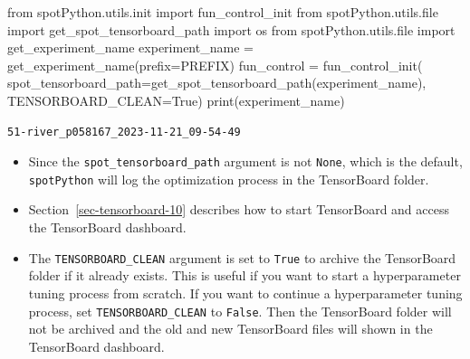\documentclass[
  letterpaper,
  DIV=11,
  numbers=noendperiod]{scrreprt}
\newenvironment{Shaded}{\begin{snugshade}}{\end{snugshade}}
\newcommand{\BuiltInTok}[1]{\textcolor[rgb]{0.00,0.23,0.31}{#1}}
\newcommand{\ImportTok}[1]{\textcolor[rgb]{0.00,0.46,0.62}{#1}}
\newcommand{\NormalTok}[1]{\textcolor[rgb]{0.00,0.23,0.31}{#1}}
\newcommand{\OperatorTok}[1]{\textcolor[rgb]{0.37,0.37,0.37}{#1}}
\newcommand{\VariableTok}[1]{\textcolor[rgb]{0.07,0.07,0.07}{#1}}
\providecommand{\tightlist}{%
  \setlength{\itemsep}{0pt}\setlength{\parskip}{0pt}}\usepackage{longtable,booktabs,array}
\begin{document}
\begin{Shaded}
\begin{Highlighting}[]
\ImportTok{from}\NormalTok{ spotPython.utils.init }\ImportTok{import}\NormalTok{ fun\_control\_init}
\ImportTok{from}\NormalTok{ spotPython.utils.}\BuiltInTok{file} \ImportTok{import}\NormalTok{ get\_spot\_tensorboard\_path}
\ImportTok{import}\NormalTok{ os}
\ImportTok{from}\NormalTok{ spotPython.utils.}\BuiltInTok{file} \ImportTok{import}\NormalTok{ get\_experiment\_name}
\NormalTok{experiment\_name }\OperatorTok{=}\NormalTok{ get\_experiment\_name(prefix}\OperatorTok{=}\NormalTok{PREFIX)}
\NormalTok{fun\_control }\OperatorTok{=}\NormalTok{ fun\_control\_init(}
\NormalTok{    spot\_tensorboard\_path}\OperatorTok{=}\NormalTok{get\_spot\_tensorboard\_path(experiment\_name),}
\NormalTok{    TENSORBOARD\_CLEAN}\OperatorTok{=}\VariableTok{True}\NormalTok{)}
\BuiltInTok{print}\NormalTok{(experiment\_name)}
\end{Highlighting}
\end{Shaded}

\begin{verbatim}
51-river_p058167_2023-11-21_09-54-49
\end{verbatim}

\begin{tcolorbox}[enhanced jigsaw, rightrule=.15mm, opacityback=0, colframe=quarto-callout-tip-color-frame, opacitybacktitle=0.6, toptitle=1mm, arc=.35mm, colbacktitle=quarto-callout-tip-color!10!white, coltitle=black, toprule=.15mm, leftrule=.75mm, titlerule=0mm, title=\textcolor{quarto-callout-tip-color}{\faLightbulb}\hspace{0.5em}{Tip: TensorBoard}, bottomrule=.15mm, breakable, bottomtitle=1mm, left=2mm, colback=white]

\begin{itemize}
\tightlist
\item
  Since the \texttt{spot\_tensorboard\_path} argument is not
  \texttt{None}, which is the default, \texttt{spotPython} will log the
  optimization process in the TensorBoard folder.
\item
  Section~\ref{sec-tensorboard-10} describes how to start TensorBoard
  and access the TensorBoard dashboard.
\item
  The \texttt{TENSORBOARD\_CLEAN} argument is set to \texttt{True} to
  archive the TensorBoard folder if it already exists. This is useful if
  you want to start a hyperparameter tuning process from scratch. If you
  want to continue a hyperparameter tuning process, set
  \texttt{TENSORBOARD\_CLEAN} to \texttt{False}. Then the TensorBoard
  folder will not be archived and the old and new TensorBoard files will
  shown in the TensorBoard dashboard.
\end{itemize}

\end{tcolorbox}
\end{document}
